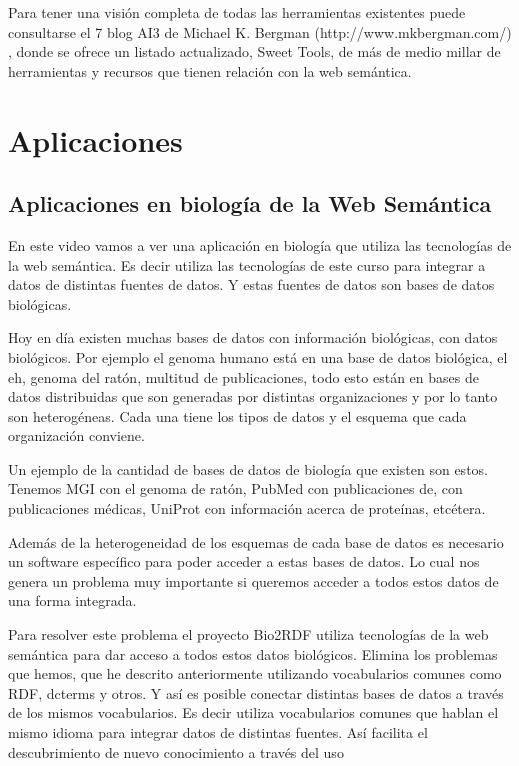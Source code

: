 Para tener una visión completa de todas las herramientas existentes puede consultarse el 7
blog AI3 de Michael K. Bergman (http://www.mkbergman.com/) , donde se ofrece un listado actualizado, Sweet Tools, de más de medio millar de herramientas y recursos que tienen relación con la web semántica.


\section{Aplicaciones}

\subsection{Aplicaciones en biología de la Web Semántica}

En este video vamos a ver una aplicación en biología que utiliza las tecnologías de la web semántica. Es decir utiliza las tecnologías de este curso para integrar a datos de distintas fuentes de datos. Y estas fuentes de datos son bases de datos biológicas.

Hoy en día existen muchas bases de datos con información biológicas, con datos biológicos. Por ejemplo el genoma humano está en una base de datos biológica, el eh, genoma del ratón, multitud de publicaciones, todo esto están en bases de datos distribuidas que son generadas por distintas organizaciones y por lo tanto son heterogéneas. Cada una tiene los tipos de datos y el esquema que cada organización conviene.

Un ejemplo de la cantidad de bases de datos de biología que existen son estos. Tenemos MGI con el genoma de ratón, PubMed con publicaciones de, con publicaciones médicas, UniProt con información acerca de proteínas, etcétera.

Además de la heterogeneidad de los esquemas de cada base de datos es necesario un software específico para poder acceder a estas bases de datos. Lo cual nos genera un problema muy importante si queremos acceder a todos estos datos de una forma integrada.

Para resolver este problema el proyecto Bio2RDF utiliza tecnologías de la web semántica para dar acceso a todos estos datos biológicos. Elimina los problemas que hemos, que he descrito anteriormente utilizando vocabularios comunes como RDF, dcterms y otros. Y así es posible conectar distintas bases de datos a través de los mismos vocabularios. Es decir utiliza vocabularios comunes que hablan el mismo idioma para integrar datos de distintas fuentes. Así facilita el descubrimiento de nuevo conocimiento a través del uso


